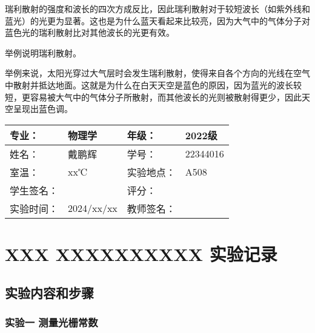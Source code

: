 \documentclass[dvipsnames, svgnames,a4paper,11pt]{article}
\begin{document}
瑞利散射的强度和波长的四次方成反比，因此瑞利散射对于较短波长（如紫外线和蓝光）的光更为显著。这也是为什么蓝天看起来比较亮，因为大气中的气体分子对蓝色光的瑞利散射比对其他波长的光更有效。



\begin{question}
	举例说明瑞利散射。
\end{question}

举例来说，太阳光穿过大气层时会发生瑞利散射，使得来自各个方向的光线在空气中散射并抵达地面。这就是为什么在白天天空是蓝色的原因，因为蓝光的波长较短，更容易被大气中的气体分子所散射，而其他波长的光则被散射得更少，因此天空呈现出蓝色调。
	

\clearpage
\begin{table}
	\renewcommand\arraystretch{1.7}
	\centering
	\begin{tabularx}{\textwidth}{|X|X|X|X|}
	\hline
	专业：& 物理学 &年级：& 2022级 \\
	\hline
	姓名：& 戴鹏辉 & 学号：& 22344016 \\
	\hline
	室温：& xx℃ & 实验地点： & A508 \\
	\hline
	学生签名：& & 评分： &\\
	\hline
	实验时间：& 2024/xx/xx & 教师签名：&\\
	\hline
	\end{tabularx}
\end{table}

\section{XXX \quad XXXXXXXXXX \quad\heiti 实验记录}
\subsection{实验内容和步骤}

	\subsubsection{实验一 测量光栅常数}
	
\end{document}
